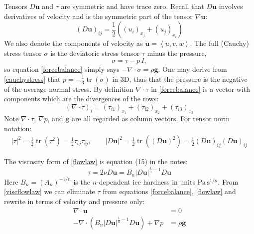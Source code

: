 \documentclass[letterpaper,final,12pt,reqno]{amsart}
\newcommand{\grad}{\nabla}
\newcommand{\Div}{\nabla\cdot}
\newcommand{\trace}{\operatorname{tr}}
\newcommand{\bg}{\mathbf{g}}
\newcommand{\bu}{\mathbf{u}}
\begin{document}
Tensors $D\bu$ and $\tau$ are symmetric and have trace zero.  Recall that $D\bu$ involves derivatives of velocity and is the symmetric part of the tensor $\grad \bu$:
\begin{equation}
(D\bu)_{ij} = \frac{1}{2} \left((u_i)_{x_j} + (u_j)_{x_i}\right) \label{strainrate}
\end{equation}
We also denote the components of velocity as $\bu=\left<u,v,w\right>$.  The full (Cauchy) stress tensor $\sigma$ is the deviatoric stress tensor $\tau$ minus the pressure,
\begin{equation}
    \sigma = \tau - p\,I,  \label{cauchystress}
\end{equation}
so equation \eqref{forcebalance} simply says $-\Div \sigma = \rho \bg$.  One may derive from \eqref{cauchystress} that $p = -\frac{1}{3} \trace(\sigma)$ in 3D, thus that the pressure is the negative of the average normal stress.  By definition $\Div\tau$ in \eqref{forcebalance} is a vector with components which are the divergences of the rows:
\begin{equation}
    \left(\nabla \cdot \tau\right)_i = \left(\tau_{i1}\right)_{x_1} + \left(\tau_{i2}\right)_{x_2} + \left(\tau_{i3}\right)_{x_3}  \label{divtaudefn}
\end{equation}
Note $\nabla\cdot \tau$, $\nabla p$, and $\bg$ are all regarded as column vectors.  For tensor norm notation:
\begin{align*}
|\tau|^2 = \frac{1}{2} \trace\left(\tau^2\right) = \frac{1}{2} \tau_{ij} \tau_{ij}, \qquad |D\bu|^2 = \frac{1}{2} \trace\left((D\bu)^2\right) = \frac{1}{2} (D\bu)_{ij} (D\bu)_{ij}
\end{align*}

The viscosity form of \eqref{flowlaw} is equation (15) in the notes:
\begin{equation}
\tau = 2\nu D\bu = B_n |D\bu|^{\frac{1}{n} - 1} D\bu  \label{viscflowlaw}
\end{equation}
Here $B_n = (A_n)^{-1/n}$ is the $n$-dependent ice hardness in units $\text{Pa}\,\text{s}^{1/n}$.  From \eqref{viscflowlaw} we can eliminate $\tau$ from equations \eqref{forcebalance}, \eqref{flowlaw} and rewrite in terms of velocity and pressure only:
\begin{align}
\Div \bu &= 0 \label{incompagain} \\
- \nabla \cdot \left(B_n |D\bu|^{\frac{1}{n} - 1} D\bu\right) + \nabla p &= \rho \mathbf{g} \label{stokes}
\end{align}
\end{document}
